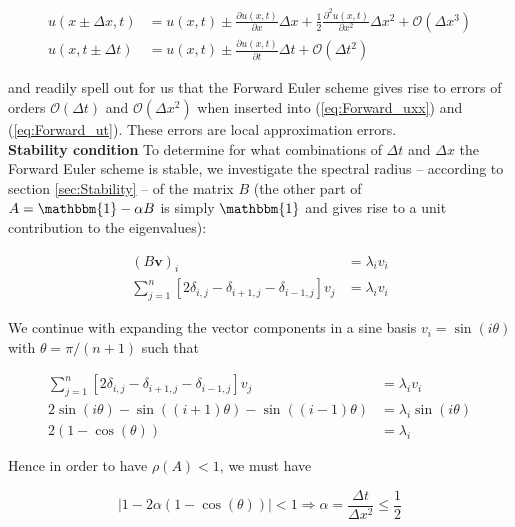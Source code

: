 \documentclass[a4paper, 11pt, notitlepage,english]{article}
\newcommand{\id}{\mathbbm{1}}
\begin{document}
\begin{align}
u(x\pm\Delta x,t) &= u(x,t) \pm \frac{\partial u(x,t)}{\partial x}\Delta x + \frac{1}{2}\frac{\partial^2 u(x,t)}{\partial x^2}\Delta x^2 + \mathcal{O}(\Delta x^3)
\label{eq:Forward_Euler_expansions1} \\
u(x,t\pm \Delta t) &= u(x,t) \pm \frac{\partial u(x,t)}{\partial t}\Delta t + \mathcal{O}(\Delta t^2)
\label{eq:Forward_Euler_expansions2}
\end{align}

and readily spell out for us that the Forward Euler scheme gives rise to errors of orders $\mathcal{O}(\Delta t)$ and $\mathcal{O}(\Delta x^2)$ when inserted into (\ref{eq:Forward_uxx}) and (\ref{eq:Forward_ut}). These errors are local approximation errors. \\


\textbf{Stability condition} \newline
To determine for what combinations of $\Delta t$ and $\Delta x$ the Forward Euler scheme is stable, we investigate the spectral radius – according to section \ref{sec:Stability} – of the matrix $B$ (the other part of $A = \id - \alpha B$ is simply $\id$ and gives rise to a unit contribution to the eigenvalues):

\begin{align}
(B\boldsymbol{v})_i &= \lambda_i v_i \\
\sum_{j=1}^n [2\delta_{i,j}-\delta_{i+1,j}-\delta_{i-1,j}]v_j &= \lambda_i v_i
\label{eq:Forward_Euler_stability1}
\end{align}

We continue with expanding the vector components in a sine basis $v_i = \sin(i\theta)$ with $\theta = \pi/(n+1)$ such that

\begin{align}
\sum_{j=1}^n [2\delta_{i,j}-\delta_{i+1,j}-\delta_{i-1,j}]v_j &= \lambda_i v_i \\
2 \sin(i\theta) - \sin\left((i+1)\theta\right) - \sin\left((i-1)\theta\right) &= \lambda_i \sin(i\theta) \\
2(1-\cos(\theta)) &= \lambda_i
\label{eq:Forward_Euler_stability2}
\end{align}

Hence in order to have $\rho(A) < 1$, we must have

\begin{equation}
\lvert 1-2\alpha(1-\cos(\theta)) \rvert < 1 \Rightarrow \alpha = \frac{\Delta t}{\Delta x^2} \leq \frac{1}{2}
\label{eq:Forward_Euler_stability3}
\end{equation}
\end{document}
